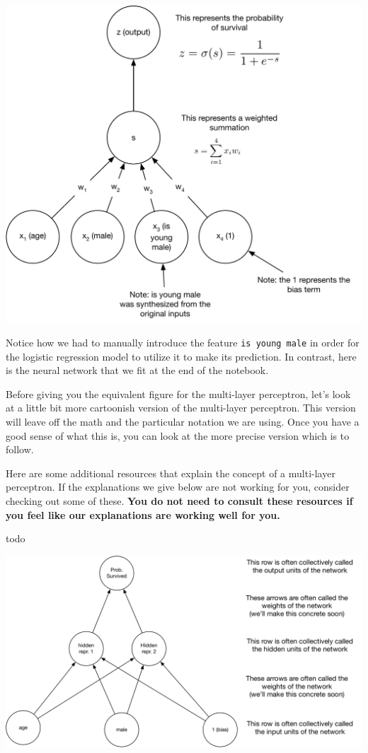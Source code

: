 \documentclass[assignment06_Solutions]{subfiles}
\begin{document}
\includegraphics[width=\linewidth]{figures/titaniclogisticregression}

Notice how we had to manually introduce the feature {\tt is young male} in order for the logistic regression model to utilize it to make its prediction.  In contrast, here is the neural network that we fit at the end of the notebook.

Before giving you the equivalent figure for the multi-layer perceptron, let's look at a little bit more cartoonish version of the multi-layer perceptron.  This version will leave off the math and the particular notation we are using.  Once you have a good sense of what this is, you can look at the more precise version which is to follow.


\begin{externalresources}
Here are some additional resources that explain the concept of a multi-layer perceptron.  If the explanations we give below are not working for you, consider checking out some of these.  \textbf{You do not need to consult these resources if you feel like our explanations are working well for you.}
\bi
\item todo
\ei
\end{externalresources}

\includegraphics[width=\linewidth]{figures/titanicmlpsimple}
\end{document}
